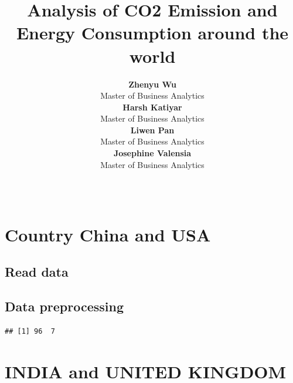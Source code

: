 \documentclass[11pt,a4paper,]{article}
\title{Analysis of CO2 Emission and Energy Consumption around the world}
\author{\sf\Large\textbf{ Zhenyu Wu}\\ {\sf\large Master of Business Analytics\\[0.5cm]} \sf\Large\textbf{ Harsh Katiyar}\\ {\sf\large Master of Business Analytics\\[0.5cm]} \sf\Large\textbf{ Liwen Pan}\\ {\sf\large Master of Business Analytics\\[0.5cm]} \sf\Large\textbf{ Josephine Valensia}\\ {\sf\large Master of Business Analytics\\[0.5cm]}}
\date{\sf\Date~\Month~\Year}
\makeatletter
\def\titlepage{\front{\expandafter{\@title}}{\@author}{\@organization}}
\makeatother
\begin{document}
\titlepage


\section*{Country China and USA}

\hypertarget{read-data}{%
\subsection{Read data}\label{read-data}}

\begin{Shaded}
\begin{Highlighting}[]
\NormalTok{(} \NormalTok{)}
\OtherTok{\textless{}{-}} \SpecialCharTok{::}\NormalTok{(}\NormalTok{))}
\end{Highlighting}
\end{Shaded}

\hypertarget{data-preprocessing}{%
\subsection{Data preprocessing}\label{data-preprocessing}}

\begin{Shaded}
\begin{Highlighting}[]
\OtherTok{\textless{}{-}}\SpecialCharTok{\%\textgreater{}\%}
   \NormalTok{(}\NormalTok{,}\NormalTok{)) }\SpecialCharTok{\%\textgreater{}\%}
  \SpecialCharTok{\textgreater{}=} \SpecialCharTok{\&}\SpecialCharTok{\textless{}=}\NormalTok{)}
\end{Highlighting}
\end{Shaded}

\begin{verbatim}
## [1] 96  7
\end{verbatim}

\hypertarget{india-and-united-kingdom}{%
\section{INDIA and UNITED KINGDOM}\label{india-and-united-kingdom}}
\end{document}
